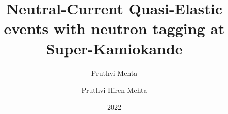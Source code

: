 \documentclass[11pt,twoside]{report}
\author{Pruthvi Mehta}
\date{2022}
\title{\textbf{Neutral-Current Quasi-Elastic events with neutron tagging at Super-Kamiokande}} \let\Title\@title
\author{Pruthvi Hiren Mehta} \let\Author\@author
\begin{document}
\pagestyle{empty}


\cleardoublepage




\cleardoublepage
\thispagestyle{empty}







\tableofcontents

\cleardoublepage
  

  
  
  
  
  
  
  
  
 

    
  


\begin{appendices}

\end{appendices}
\end{document}
